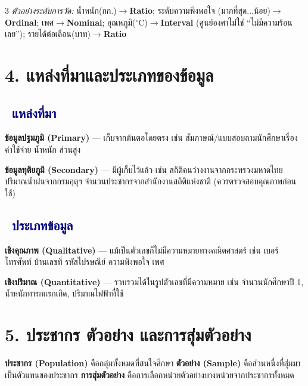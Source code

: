 \documentclass[9pt]{extarticle}
\newcommand{\dist}[1]{\subsection*{\textcolor{navy}{\textbullet\ #1}}}
\begin{document}
\begin{multicols}{3}
\textit{ตัวอย่างระดับการวัด:} น้ำหนัก(กก.)$\to$\textbf{Ratio}; ระดับความพึงพอใจ (มากที่สุด...น้อย)$\to$\textbf{Ordinal}; เพศ$\to$\textbf{Nominal}; อุณหภูมิ($^\circ$C)$\to$\textbf{Interval} (ศูนย์องศาไม่ใช่ ``ไม่มีความร้อนเลย''); รายได้ต่อเดือน(บาท)$\to$\textbf{Ratio}

\section*{4. แหล่งที่มาและประเภทของข้อมูล}
\dist{แหล่งที่มา}
\textbf{ข้อมูลปฐมภูมิ (Primary)} — เก็บจากต้นตอโดยตรง เช่น สัมภาษณ์/แบบสอบถามนักศึกษาเรื่องค่าใช้จ่าย น้ำหนัก ส่วนสูง

\textbf{ข้อมูลทุติยภูมิ (Secondary)} — มีผู้เก็บไว้แล้ว เช่น สถิติคนว่างงานจากกระทรวงมหาดไทย ปริมาณน้ำฝนจากกรมอุตุฯ จำนวนประชากรจากสำนักงานสถิติแห่งชาติ (ควรตรวจสอบคุณภาพก่อนใช้)

\dist{ประเภทข้อมูล}
\textbf{เชิงคุณภาพ (Qualitative)} — แม้เป็นตัวเลขก็ไม่มีความหมายทางคณิตศาสตร์ เช่น เบอร์โทรศัพท์ บ้านเลขที่ รหัสไปรษณีย์ ความพึงพอใจ เพศ

\textbf{เชิงปริมาณ (Quantitative)} — รวบรวมได้ในรูปตัวเลขที่มีความหมาย เช่น จำนวนนักศึกษาปี 1, น้ำหนักทารกแรกเกิด, ปริมาณไฟฟ้าที่ใช้

\section*{5. ประชากร ตัวอย่าง และการสุ่มตัวอย่าง}
\textbf{ประชากร (Population)} คือกลุ่มทั้งหมดที่สนใจศึกษา \textbf{ตัวอย่าง (Sample)} คือส่วนหนึ่งที่สุ่มมาเป็นตัวแทนของประชากร \textbf{การสุ่มตัวอย่าง} คือการเลือกหน่วยตัวอย่างบางหน่วยจากประชากรทั้งหมด


\end{multicols}
\end{document}
